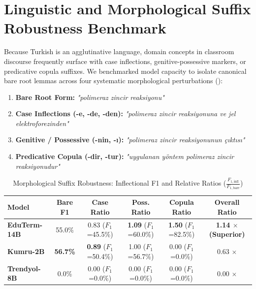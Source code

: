 \documentclass[a4paper,12pt]{report}
\begin{document}
\section{Linguistic and Morphological Suffix Robustness Benchmark}
\label{sec:morphological_robustness_benchmark}
Because Turkish is an agglutinative language, domain concepts in classroom discourse frequently surface with case inflections, genitive-possessive markers, or predicative copula suffixes. We benchmarked model capacity to isolate canonical bare root lemmas across four systematic morphological perturbations ():
\begin{enumerate}
    \item \textbf{Bare Root Form:} \textit{"polimeraz zincir reaksiyonu"}
    \item \textbf{Case Inflections (-e, -de, -den):} \textit{"polimeraz zincir reaksiyonuna ve jel elektroforezinden"}
    \item \textbf{Genitive / Possessive (-nin, -ı):} \textit{"polimeraz zincir reaksiyonunun çıktısı"}
    \item \textbf{Predicative Copula (-dir, -tur):} \textit{"uygulanan yöntem polimeraz zincir reaksiyonudur"}
\end{enumerate}

\begin{table}[htbp]
\centering
\small
\caption{Morphological Suffix Robustness: Inflectional F1 and Relative Ratios ($\frac{F_{1,\text{infl}}}{F_{1,\text{bare}}}$)}
\label{tab:morphological_robustness}
\scriptsize\setlength{\tabcolsep}{2pt}
\begin{tabularx}{\textwidth}{>{\RaggedRight\arraybackslash}Xccccc}
\hline
\textbf{Model} & \textbf{Bare F1} & \textbf{Case Ratio} & \textbf{Poss. Ratio} & \textbf{Copula Ratio} & \textbf{Overall Ratio} \\
\hline
\textbf{EduTerm-14B} & 55.0\% & 0.83 ($F_1$=45.5\%) & \textbf{1.09} ($F_1$=60.0\%) & \textbf{1.50} ($F_1$=82.5\%) & \textbf{1.14 $\times$} \textbf{(Superior)} \\
\textbf{Kumru-2B} & \textbf{56.7\%} & \textbf{0.89} ($F_1$=50.4\%) & 1.00 ($F_1$=56.7\%) & 0.00 ($F_1$=0.0\%) & 0.63 $\times$ \\
\textbf{Trendyol-8B} & 0.0\% & 0.00 ($F_1$=0.0\%) & 0.00 ($F_1$=0.0\%) & 0.00 ($F_1$=0.0\%) & 0.00 $\times$ \\
\hline
\end{tabularx}
\end{table}
\end{document}
